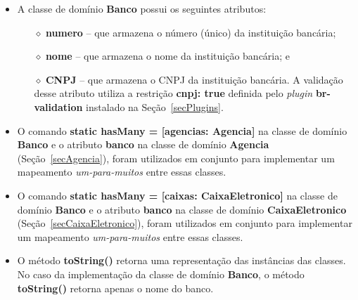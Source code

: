 \begin{itemize}

\item A classe de domínio {\bf Banco} possui os seguintes atributos:

\vspace{0.5cm}

\begin{itemize}

\item[$\diamond$] {\bf numero}  -- que armazena o número  (único) da instituição
  bancária; 

\vspace{0.5cm}

\item[$\diamond$] {\bf nome} -- que armazena o nome da instituição bancária; e

\vspace{0.5cm}

\item[$\diamond$] {\bf CNPJ} -- que  armazena o CNPJ da instituição bancária.  A
  validação desse  atributo utiliza a  restrição {\bf cnpj: true}  definida pelo
  {\it plugin} {\bf br-validation} instalado na Seção~\ref{secPlugins}.

\end{itemize}

\vspace{0.5cm}

\item O comando {\bf static hasMany  = [agencias: Agencia]} na classe de domínio
  {\bf  Banco} e  o atributo  {\bf  banco} na  classe de  domínio {\bf  Agencia}
  (Seção~\ref{secAgencia}),  foram utilizados  em conjunto  para  implementar um
  mapeamento {\em um-para-muitos} entre essas classes.
 
\vspace{0.5cm}

\item O  comando {\bf static hasMany  = [caixas: CaixaEletronico]}  na classe de
  domínio  {\bf Banco}  e  o atributo  {\bf  banco} na  classe  de domínio  {\bf
    CaixaEletronico}   (Seção~\ref{secCaixaEletronico}),  foram   utilizados  em
  conjunto  para  implementar um  mapeamento  {\em  um-para-muitos} entre  essas
  classes.

\vspace{0.5cm}

\item O  método {\bf  toString()} retorna uma  representação das  instâncias das
  classes.  No caso da implementação da  classe de domínio {\bf Banco}, o método
  {\bf toString()} retorna apenas o nome do banco.

\end{itemize}

